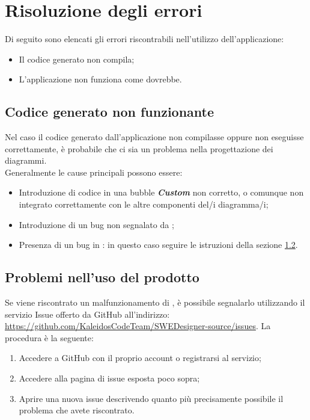\documentclass[../ManualeUtente.tex]{subfiles}
\begin{document}
	\section{Risoluzione degli errori}
		Di seguito sono elencati gli errori riscontrabili nell'utilizzo dell'applicazione:
		\begin{itemize}
			\item Il codice generato non compila;
			\item L'applicazione non funziona come dovrebbe.
		\end{itemize}
		\subsection{Codice generato non funzionante}
			Nel caso il codice generato dall'applicazione non compilasse oppure non eseguisse correttamente, è
			probabile che ci sia un problema nella progettazione dei diagrammi.\\
			Generalmente le cause principali possono essere:
			\begin{itemize}
				\item Introduzione di codice in una bubble \textit{\textbf{Custom}} non corretto, o comunque non
				integrato correttamente con le altre componenti del/i diagramma/i;
				\item Introduzione di un bug non segnalato da \progetto;
				\item Presenza di un bug in \progetto: in questo caso seguire le istruzioni della sezione \ref{sez:ProblemiProdotto}.
			\end{itemize}
		\subsection{Problemi nell'uso del prodotto}\label{sez:ProblemiProdotto}
			Se viene riscontrato un malfunzionamento di \progetto, è possibile segnalarlo utilizzando il servizio
			Issue offerto da GitHub all'indirizzo: \url{https://github.com/KaleidosCodeTeam/SWEDesigner-source/issues}.
			La procedura è la seguente:
			\begin{enumerate}
				\item Accedere a GitHub con il proprio account o registrarsi al servizio;
				\item Accedere alla pagina di issue esposta poco sopra;
				\item Aprire una nuova issue descrivendo quanto più precisamente possibile il problema che
				avete riscontrato.
			\end{enumerate}
\end{document}
